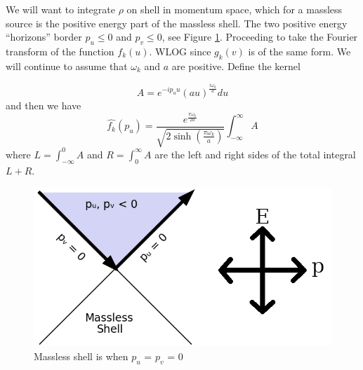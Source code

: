 \documentclass[12pt,a4paper]{article}
\begin{document}
We will want to integrate $\rho$ on shell in momentum space, which for a massless source is the positive energy part of the massless shell.  The two positive energy ``horizons'' border $p_u \le 0$ and $p_v \le 0$, see Figure \ref{masslessshell}.  Proceeding to take the Fourier transform of the function $f_k(u)$.  WLOG since $g_k(v)$ is of the same form.  We will continue to assume that $\omega_k$ and $a$ are positive. Define the kernel

\begin{equation}
  A = e^{-i p_u u} (au)^\frac{i\omega_k}{a} du
\end{equation}
and then we have
\begin{equation}
\label{finalnorm}
  \hat{f_k}(p_u) =  \frac{e^{\frac{\pi \omega_k}{2a}}}{\sqrt{2 \sinh \left({\frac{\pi\omega_k}{a}}\right)}}  \int_{-\infty}^\infty A
\end{equation}
where $L=\int_{-\infty}^0 A$ and $R=\int_0^\infty A$ are the left and right sides of the total integral $L + R$.

\begin{figure}[h]
\centering
\includegraphics[scale=0.5]{massless_shell.png}
\caption{Massless shell is when $p_u$ = $p_v$ = 0}
\label{masslessshell}
\end{figure}
\end{document}
